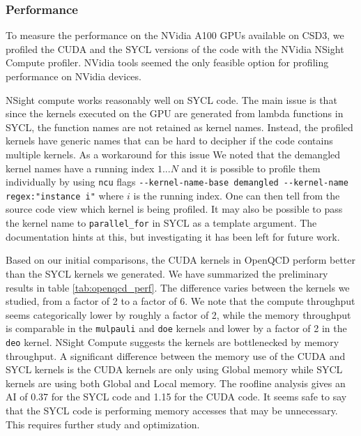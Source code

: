 
\subsubsection{Performance}\label{sec:openqcd_performance}

To measure the performance on the NVidia A100 GPUs available on CSD3, we profiled the CUDA and the SYCL versions of the code with the NVidia NSight Compute profiler. NVidia tools seemed the only feasible option for profiling performance on NVidia devices.

NSight compute works reasonably well on SYCL code. The main issue is that since the kernels executed on the GPU are generated from lambda functions in SYCL, the function names are not retained as kernel names. Instead, the profiled kernels have generic names that can be hard to decipher if the code contains multiple kernels. As a workaround for this issue We noted that the demangled kernel names have a running index $1 ... N$ and it is possible to profile them individually by using \verb #ncu# flags \verb #--kernel-name-base demangled --kernel-name regex:"instance i"# where $i$ is the running index. One can then tell from the source code view which kernel is being profiled. It may also be possible to pass the kernel name to \verb #parallel_for# in SYCL as a template argument. The documentation hints at this, but investigating it has been left for future work.

Based on our initial comparisons, the CUDA kernels in OpenQCD perform better than the SYCL kernels we generated. We have summarized the preliminary results in table \ref{tab:openqcd_perf}. The difference varies between the kernels we studied, from a factor of 2 to a factor of 6. We note that the compute throughput seems categorically lower by roughly a factor of 2, while the memory throughput is comparable in the \verb #mulpauli# and \verb #doe# kernels and lower by a factor of 2 in the \verb #deo# kernel. NSight Compute suggests the kernels are bottlenecked by memory throughput. A significant difference between the memory use of the CUDA and SYCL kernels is the CUDA kernels are only using Global memory while SYCL kernels are using both Global and Local memory. The roofline analysis gives an AI of 0.37 for the SYCL code and 1.15 for the CUDA code. It seems safe to say that the SYCL code is performing memory accesses that may be unnecessary. This requires further study and optimization.

